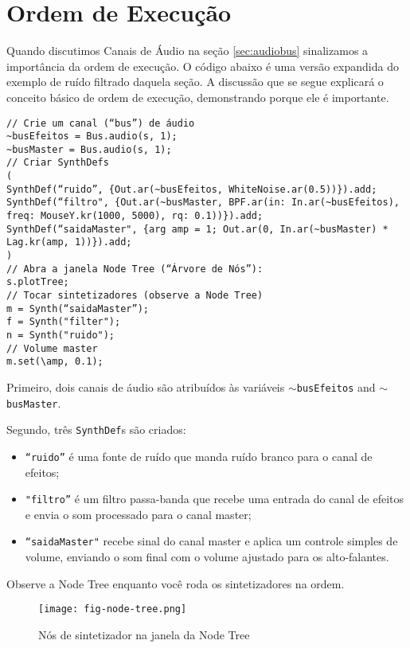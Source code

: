 \section{Ordem de Execução}
\label{sec:order-of-execution}

Quando discutimos Canais de Áudio na seção \ref{sec:audiobus} sinalizamos a importância da ordem de execução. O código abaixo é uma versão expandida do exemplo de ruído filtrado daquela seção. A discussão que se segue explicará o conceito básico de ordem de execução, demonstrando porque ele é importante.


\begin{lstlisting}[style=SuperCollider-IDE, basicstyle=\scttfamily\footnotesize]
// Crie um canal (“bus”) de áudio
~busEfeitos = Bus.audio(s, 1);
~busMaster = Bus.audio(s, 1);
// Criar SynthDefs
(
SynthDef(“ruido”, {Out.ar(~busEfeitos, WhiteNoise.ar(0.5))}).add;
SynthDef(“filtro", {Out.ar(~busMaster, BPF.ar(in: In.ar(~busEfeitos), freq: MouseY.kr(1000, 5000), rq: 0.1))}).add;
SynthDef(“saidaMaster", {arg amp = 1; Out.ar(0, In.ar(~busMaster) * Lag.kr(amp, 1))}).add;
)
// Abra a janela Node Tree (“Árvore de Nós”):
s.plotTree;
// Tocar sintetizadores (observe a Node Tree)
m = Synth(“saidaMaster”);
f = Synth("filter");
n = Synth("ruido");
// Volume master
m.set(\amp, 0.1);
\end{lstlisting}

Primeiro, dois canais de áudio são atribuídos às variáveis \texttt{$\sim$busEfeitos} and \texttt{$\sim$busMaster}.

Segundo, três \texttt{SynthDef}s são criados:
\begin{itemize}
\item \texttt{“ruido”} é uma fonte de ruído que manda ruído branco para o canal de efeitos;
\item \texttt{"filtro”} é um filtro passa-banda que recebe uma entrada do canal de efeitos e envia o som processado para o canal master;
\item \texttt{“saidaMaster"} recebe sinal do canal master e aplica um controle simples de volume, enviando o som final com o volume ajustado para os alto-falantes.
\end{itemize}

Observe a Node Tree enquanto você roda os sintetizadores na ordem.

\begin{figure}[h]
\centerline{
	\texttt{[image: fig-node-tree.png]}}
\caption{Nós de sintetizador na janela da Node Tree}
\label{fig:node-tree}
\end{figure}

